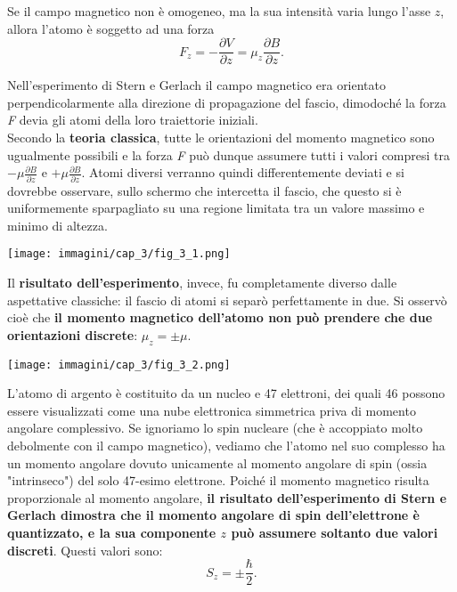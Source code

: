 \documentclass[a4paper,12pt,oneside]{book}
\begin{document}
Se il campo magnetico non è omogeneo, ma la sua intensità varia lungo l'asse $z$, allora l'atomo è soggetto ad una forza
	\begin{equation}
		\boxed{			
			F_z= - \frac{\partial V}{\partial z}= \mu_z\frac{\partial B}{\partial z} .
			}
\end{equation}

Nell'esperimento di Stern e Gerlach il campo magnetico era orientato perpendicolarmente alla direzione di propagazione del fascio, dimodoché la forza \emph{F} devia gli atomi della loro traiettorie iniziali.\\

Secondo la \textbf{teoria classica}, tutte le orientazioni del momento magnetico sono ugualmente possibili e la forza \emph{F} può dunque assumere tutti i valori compresi tra $-\mu \frac{\partial B}{\partial z}$ e $+\mu \frac{\partial B}{\partial z}$. Atomi diversi verranno quindi differentemente deviati e si dovrebbe osservare, sullo schermo che intercetta il fascio, che questo si è uniformemente sparpagliato su una regione limitata tra un valore massimo e minimo di altezza.
\begin{center}
\texttt{[image: immagini/cap\_3/fig\_3\_1.png]}
\end{center}
Il \textbf{risultato dell'esperimento}, invece, fu completamente diverso dalle aspettative classiche: il fascio di atomi si separò perfettamente in due. Si osservò cioè che \textbf{il momento magnetico dell'atomo non può prendere che due orientazioni discrete}: $\mu_z=\pm \mu $.\\
\begin{center}
\texttt{[image: immagini/cap\_3/fig\_3\_2.png]}
\end{center}

L'atomo di argento è costituito da un nucleo e 47 elettroni, dei quali 46 possono essere visualizzati come una nube elettronica simmetrica priva di momento angolare complessivo. Se ignoriamo lo spin nucleare (che è accoppiato molto debolmente con il campo magnetico), vediamo che l'atomo nel suo complesso ha un momento angolare dovuto unicamente al momento angolare di spin (ossia "intrinseco") del solo 47-esimo elettrone. Poiché il momento magnetico risulta proporzionale al momento angolare, \textbf{il risultato dell'esperimento di Stern e Gerlach dimostra che il momento angolare di spin dell'elettrone è quantizzato, e la sua componente $z$ può assumere soltanto due valori discreti}. Questi valori sono:
	\begin{equation}
		\boxed{
			S_z= \pm \frac{\hbar}{2}.
			}
	\end{equation} 
\end{document}
